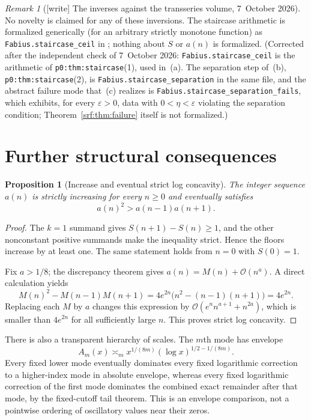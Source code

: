 \documentclass[11pt]{article}
\newtheorem{proposition}[theorem]{Proposition}
\theoremstyle{remark}\newtheorem{remark}[theorem]{Remark}
\newcommand{\OO}{\mathcal O}
\newcommand{\file}[1]{\nolinkurl{#1}}
\begin{document}
\begin{remark}[{[write]} The inverses against the transseries volume, 7~October 2026]
No novelty is claimed for any of these inversions. The staircase arithmetic
is formalized generically (for an arbitrary strictly monotone function) as
\file{Fabius.staircase_ceil} in
;
nothing about $S$ or $a(n)$ is formalized. (Corrected after the independent
check of 7~October 2026: \file{Fabius.staircase_ceil} is the arithmetic of
\file{p0:thm:staircase}(1), used in~(a). The separation step of~(b),
\file{p0:thm:staircase}(2), is \file{Fabius.staircase_separation} in the
same file, and the abstract failure mode that~(c) realizes is
\file{Fabius.staircase_separation_fails}, which exhibits, for every
$\varepsilon>0$, data with $0<\eta<\varepsilon$ violating the separation
condition; Theorem~\ref{srf:thm:failure} itself is not formalized.)
\end{remark}

\section{Further structural consequences}\label{srf:sec:consequences}
\begin{proposition}[Increase and eventual strict log concavity]\label{srf:prop:logconcavity}
The integer sequence $a(n)$ is strictly increasing for every $n\ge0$ and eventually satisfies
\[
 a(n)^2>a(n-1)a(n+1).
\]
\end{proposition}
\begin{proof}
The $k=1$ summand gives $S(n+1)-S(n)\ge1$, and the other nonconstant positive summands make the inequality strict. Hence the floors increase by at least one. The same statement holds from $n=0$ with $S(0)=1$.

Fix $a>1/8$; the discrepancy theorem gives $a(n)=M(n)+\OO(n^a)$. A direct calculation yields
\[
 M(n)^2-M(n-1)M(n+1)
 =4e^{2n}\bigl(n^2-(n-1)(n+1)\bigr)=4e^{2n}.
\]
Replacing each $M$ by $a$ changes this expression by
$\OO(e^nn^{a+1}+n^{2a})$, which is smaller than $4e^{2n}$ for all sufficiently large $n$. This proves strict log concavity.
\end{proof}

There is also a transparent hierarchy of scales. The $m$th mode has envelope
\[
 A_m(x)\asymp_m x^{1/(8m)}(\log x)^{1/2-1/(8m)}.
\]
Every fixed lower mode eventually dominates every fixed logarithmic correction to a higher-index mode in absolute envelope, whereas every fixed logarithmic correction of the first mode dominates the combined exact remainder after that mode, by the fixed-cutoff tail theorem. This is an envelope comparison, not a pointwise ordering of oscillatory values near their zeros.
\end{document}
